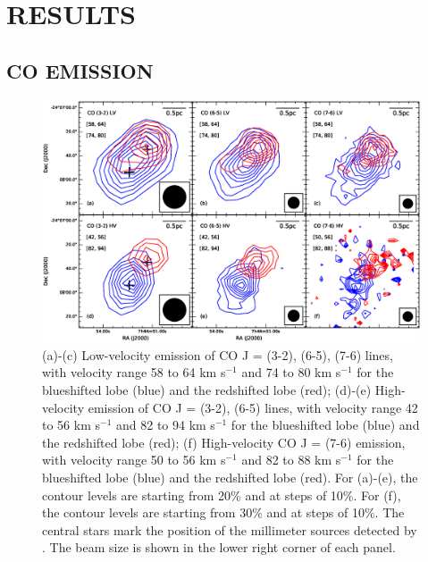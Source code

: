 \section{RESULTS}
\subsection{CO EMISSION}

\begin{figure}[htbp]
\includegraphics[scale=.60]{./fig/ori_contour.eps}
\caption{(a)-(c) Low-velocity emission of CO J = (3-2), (6-5), (7-6) lines, with velocity range 58 to 64 km s$^{-1} $ and 74 to 80 km s$^{-1}$ for the blueshifted lobe (blue) and the redshifted lobe (red); (d)-(e) High-velocity emission of CO J = (3-2), (6-5) lines, with velocity range 42 to 56 km s$^{-1} $ and 82 to 94 km s$^{-1}$ for the blueshifted lobe (blue) and  the redshifted lobe (red); (f) High-velocity CO J = (7-6) emission, with velocity range 50 to 56 km s$^{-1} $ and 82 to 88 km s$^{-1}$ for the blueshifted lobe (blue) and  the redshifted lobe (red). For (a)-(e), the contour levels are starting from 20\% and at steps of 10\%. For (f), the contour levels are starting from 30\% and at steps of 10\%. The central stars mark the position of the millimeter sources detected by \citet{2009ApJ...696...66Q}. The beam size is shown in the lower right corner of each panel.  \label{fig1}}
\end{figure}

